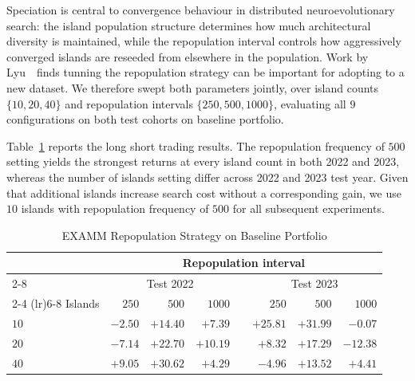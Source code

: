 Speciation is central to convergence behaviour in distributed neuroevolutionary search: the island population structure determines how much architectural diversity is maintained, while the repopulation interval controls how aggressively converged islands are reseeded from elsewhere in the population. Work by Lyu~\etal~finds tunning the repopulation strategy can be important for adopting to a new dataset\cite{lyu2021improving}\cite{lyu2023online}.  We therefore swept both parameters jointly, over island counts $\{10, 20, 40\}$ and repopulation intervals $\{250, 500, 1000\}$, evaluating all $9$ configurations on both test cohorts on baseline portfolio.

Table~\ref{tab:hp-grid} reports the long short trading results. The repopulation frequency of $500$ setting yields the strongest returns at every island count in both 2022 and 2023, whereas the number of islands setting differ across 2022 and 2023 test year.
Given that additional islands increase search cost without a corresponding gain, we use $10$ islands with repopulation frequency of $500$ for all subsequent experiments.



\begin{table}[t]
\centering
\caption{EXAMM Repopulation Strategy on Baseline Portfolio}
\label{tab:hp-grid}
\begin{tabular}{l rrr c rrr}
\toprule
& \multicolumn{7}{c}{Repopulation interval} \\
\cmidrule(lr){2-8}
& \multicolumn{3}{c}{Test 2022} & & \multicolumn{3}{c}{Test 2023} \\
\cmidrule(lr){2-4} \cmidrule(lr){6-8}
Islands & $250$ & $500$ & $1000$ & & $250$ & $500$ & $1000$ \\
\midrule
$10$ & $-2.50$ & $\mathbf{+14.40}$ & $+7.39$ & & $+25.81$ & $\mathbf{+31.99}$ & $-0.07$ \\
$20$ & $-7.14$ & $+22.70$ & $+10.19$ & & $+8.32$ & $+17.29$ & $-12.38$ \\
$40$ & $+9.05$ & $+30.62$ & $+4.29$ & & $-4.96$ & $+13.52$ & $+4.41$ \\
\bottomrule
\end{tabular}
\end{table}

